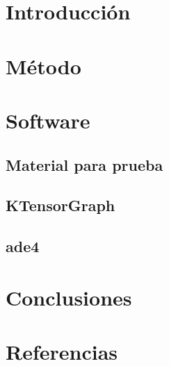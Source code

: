 \documentclass[
  10pt,
  spanish,
]{article}
\begin{document}
\hypertarget{introducciuxf3n}{%
\section{Introducción}\label{introducciuxf3n}}

\hypertarget{muxe9todo}{%
\section{Método}\label{muxe9todo}}

\hypertarget{software}{%
\section{Software}\label{software}}

\hypertarget{material-para-prueba}{%
\subsection{Material para prueba}\label{material-para-prueba}}

\hypertarget{ktensorgraph}{%
\subsection{KTensorGraph}\label{ktensorgraph}}

\hypertarget{ade4}{%
\subsection{ade4}\label{ade4}}

\hypertarget{conclusiones}{%
\section{Conclusiones}\label{conclusiones}}

\hypertarget{referencias}{%
\section{Referencias}\label{referencias}}
\end{document}
